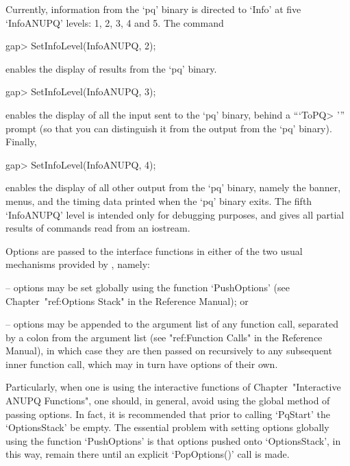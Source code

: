 Currently, information from the `pq' binary is directed to `Info' at five
`InfoANUPQ' levels: 1, 2, 3, 4 and 5. The command

\beginexample
gap> SetInfoLevel(InfoANUPQ, 2);
\endexample

enables the display of results from the `pq'  binary.

\beginexample
gap> SetInfoLevel(InfoANUPQ, 3);
\endexample

enables the display of all the input sent to the `pq'  binary,  behind  a
```ToPQ> ''' prompt (so that you can distinguish it from the output  from
the `pq' binary). Finally,

\beginexample
gap> SetInfoLevel(InfoANUPQ, 4);
\endexample

enables the display of all other output from the `pq' binary, namely  the
banner, menus, and the timing data printed when the  `pq'  binary  exits.
The fifth `InfoANUPQ' level is intended only for debugging purposes,  and
gives all partial results of commands read from an iostream.


Options are passed to the {\ANUPQ} interface functions in either  of  the
two usual mechanisms provided by {\GAP}, namely:

\beginlist

\item{--} options may be set globally using  the  function  `PushOptions'
(see Chapter~"ref:Options Stack" in the {\GAP} Reference Manual); or

\item{--} options may be appended to the argument list  of  any  function
call, separated by a colon from  the  argument  list  (see  "ref:Function
Calls" in the {\GAP} Reference Manual),  in  which  case  they  are  then
passed on recursively to any subsequent inner function call, which may in
turn have options of their own.

\endlist

Particularly,  when  one  is   using   the   interactive   functions   of
Chapter~"Interactive ANUPQ Functions",  one  should,  in  general,  avoid
using the global method of passing options. In fact,  it  is  recommended
that  prior  to  calling  `PqStart'  the  `OptionsStack'  be  empty.  The
essential problem  with  setting  options  globally  using  the  function
`PushOptions' is that options pushed onto `OptionsStack',  in  this  way,
remain there until an explicit `PopOptions()' call is made.

